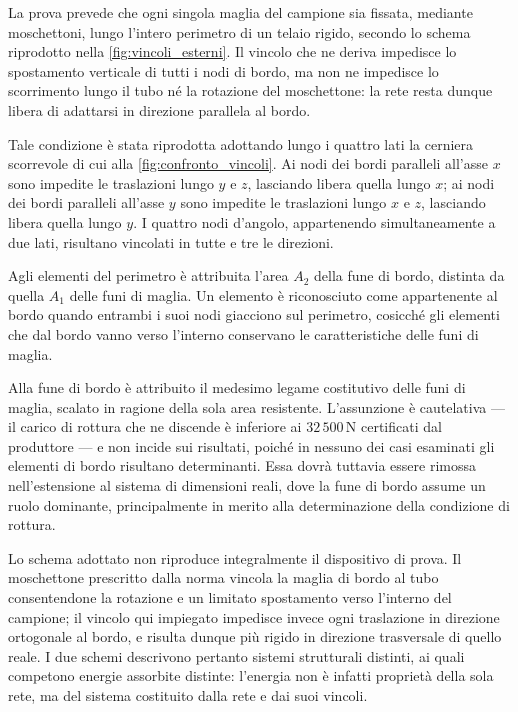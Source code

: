 La prova prevede che ogni singola maglia del campione sia fissata, mediante moschettoni, lungo l'intero perimetro di un telaio rigido, secondo lo schema riprodotto nella \cref{fig:vincoli_esterni}. Il vincolo che ne deriva impedisce lo spostamento verticale di tutti i nodi di bordo, ma non ne impedisce lo scorrimento lungo il tubo né la rotazione del moschettone: la rete resta dunque libera di adattarsi in direzione parallela al bordo.

Tale condizione è stata riprodotta adottando lungo i quattro lati la cerniera scorrevole di cui alla \cref{fig:confronto_vincoli}. Ai nodi dei bordi paralleli all'asse $x$ sono impedite le traslazioni lungo $y$ e $z$, lasciando libera quella lungo $x$; ai nodi dei bordi paralleli all'asse $y$ sono impedite le traslazioni lungo $x$ e $z$, lasciando libera quella lungo $y$. I quattro nodi d'angolo, appartenendo simultaneamente a due lati, risultano vincolati in tutte e tre le direzioni.

Agli elementi del perimetro è attribuita l'area $A_2$ della fune di bordo, distinta da quella $A_1$ delle funi di maglia. Un elemento è riconosciuto come appartenente al bordo quando entrambi i suoi nodi giacciono sul perimetro, cosicché gli elementi che dal bordo vanno verso l'interno conservano le caratteristiche delle funi di maglia.

Alla fune di bordo è attribuito il medesimo legame costitutivo delle funi di maglia, scalato in ragione della sola area resistente. L'assunzione è cautelativa — il carico di rottura che ne discende è inferiore ai $32\,500\,\text{N}$ certificati dal produttore — e non incide sui risultati, poiché in nessuno dei casi esaminati gli elementi di bordo risultano determinanti. Essa dovrà tuttavia essere rimossa nell'estensione al sistema di dimensioni reali, dove la fune di bordo assume un ruolo dominante, principalmente in merito alla determinazione della condizione di rottura.

Lo schema adottato non riproduce integralmente il dispositivo di prova. Il moschettone prescritto dalla norma vincola la maglia di bordo al tubo consentendone la rotazione e un limitato spostamento verso l'interno del campione; il vincolo qui impiegato impedisce invece ogni traslazione in direzione ortogonale al bordo, e risulta dunque più rigido in direzione trasversale di quello reale. I due schemi descrivono pertanto sistemi strutturali distinti, ai quali competono energie assorbite distinte: l'energia non è infatti proprietà della sola rete, ma del sistema costituito dalla rete e dai suoi vincoli.

